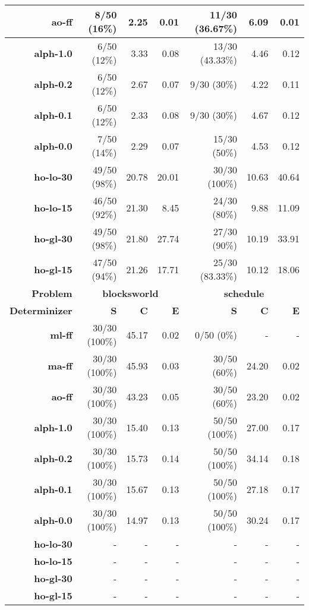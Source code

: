 \documentclass[../root.tex]{subfiles}
\begin{document}
\begin{table}[tbp]
{\begin{tabular}{|r|r|r|r|r|r|r|}
\textbf{ao-ff} & 8/50 (16\%) & 2.25 & 0.01 & 11/30 (36.67\%) & 6.09 & 0.01 \\ \hline
\textbf{alph-1.0} & 6/50 (12\%) & 3.33 & 0.08 & 13/30 (43.33\%) & 4.46 & 0.12 \\ \hline
\textbf{alph-0.2} & 6/50 (12\%) & 2.67 & 0.07 & 9/30 (30\%) & 4.22 & 0.11 \\ \hline
\textbf{alph-0.1} & 6/50 (12\%) & 2.33 & 0.08 & 9/30 (30\%) & 4.67 & 0.12 \\ \hline
\textbf{alph-0.0} & 7/50 (14\%) & 2.29 & 0.07 & 15/30 (50\%) & 4.53 & 0.12 \\ \hline
\textbf{ho-lo-30} & 49/50 (98\%) & 20.78 & 20.01 & 30/30 (100\%) & 10.63 & 40.64 \\ \hline
\textbf{ho-lo-15} & 46/50 (92\%) & 21.30 & 8.45 & 24/30 (80\%) & 9.88 & 11.09 \\ \hline
\textbf{ho-gl-30} & 49/50 (98\%) & 21.80 & 27.74 & 27/30 (90\%) & 10.19 & 33.91 \\ \hline
\textbf{ho-gl-15} & 47/50 (94\%) & 21.26 & 17.71 & 25/30 (83.33\%) & 10.12 & 18.06 \\ \hline\hline
\textbf{Problem} & \multicolumn{ 3}{c|}{\textbf{blocksworld}} & \multicolumn{ 3}{c|}{\textbf{schedule}} \\ \hline
\textbf{Determinizer} & \textbf{S} & \textbf{C} & \textbf{E} & \textbf{S} & \textbf{C} & \textbf{E} \\ \hline
\textbf{ml-ff} & 30/30 (100\%) & 45.17 & 0.02 & 0/50 (0\%) & - & - \\ \hline
\textbf{ma-ff} & 30/30 (100\%) & 45.93 & 0.03 & 30/50 (60\%) & 24.20 & 0.02 \\ \hline
\textbf{ao-ff} & 30/30 (100\%) & 43.23 & 0.05 & 30/50 (60\%) & 23.20 & 0.02 \\ \hline
\textbf{alph-1.0} & 30/30 (100\%) & 15.40 & 0.13 & 50/50 (100\%) & 27.00 & 0.17 \\ \hline
\textbf{alph-0.2} & 30/30 (100\%) & 15.73 & 0.14 & 50/50 (100\%) & 34.14 & 0.18 \\ \hline
\textbf{alph-0.1} & 30/30 (100\%) & 15.67 & 0.13 & 50/50 (100\%) & 27.18 & 0.17 \\ \hline
\textbf{alph-0.0} & 30/30 (100\%) & 14.97 & 0.13 & 50/50 (100\%) & 30.24 & 0.17 \\ \hline
\textbf{ho-lo-30} & - & - & - & - & - & - \\ \hline
\textbf{ho-lo-15} & - & - & - & - & - & - \\ \hline
\textbf{ho-gl-30} & - & - & - & - & - & - \\ \hline
\textbf{ho-gl-15} & - & - & - & - & - & - \\ \hline
\end{tabular}}
\label{results-determinization}
\end{table}
\end{document}
